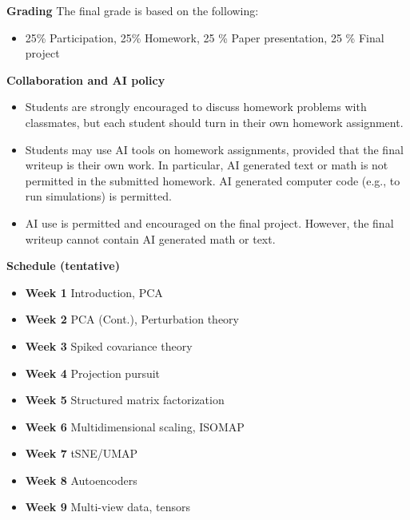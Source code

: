 \documentclass[11pt]{article}
\begin{document}
\textbf{Grading} \quad The final grade is based on the following:
\begin{itemize}
  \item 25\% Participation, 25\% Homework, 25 \% Paper presentation, 25 \% Final project
\end{itemize}

\textbf{Collaboration and AI policy}

\begin{itemize}
  \item Students are strongly encouraged to discuss homework problems with classmates, but each student should turn in their own homework assignment. 
  \item Students may use AI tools on homework assignments, provided that the final writeup is their own work. In particular, AI generated text or math is not permitted in the submitted homework. AI generated computer code (e.g., to run simulations) is permitted. 
  \item AI use is permitted and encouraged on the final project. However, the final writeup cannot contain AI generated math or text. 
\end{itemize}

\newpage

\textbf{Schedule (tentative)}

\medskip

\begin{itemize}
  \item \textbf{Week 1} Introduction, PCA 
  \item \textbf{Week 2} PCA (Cont.), Perturbation theory
  \item \textbf{Week 3} Spiked covariance theory
  \item \textbf{Week 4} Projection pursuit
  \item \textbf{Week 5} Structured matrix factorization
  \item \textbf{Week 6} Multidimensional scaling, ISOMAP
  \item \textbf{Week 7} tSNE/UMAP
  \item \textbf{Week 8} Autoencoders
  \item \textbf{Week 9} Multi-view data, tensors
\end{itemize}
\end{document}
